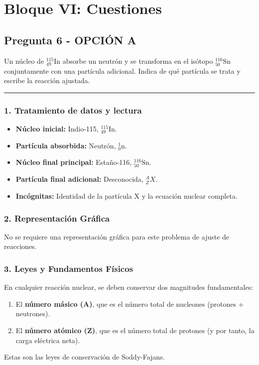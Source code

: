 \newpage

\section{Bloque VI: Cuestiones}
\label{sec:nuclear_2006_sep}

\subsection{Pregunta 6 - OPCIÓN A}
\label{subsec:6A_2006_sep}

\begin{cajaenunciado}
Un núcleo de ${}_{49}^{115}\text{In}$ absorbe un neutrón y se transforma en el isótopo ${}_{50}^{116}\text{Sn}$ conjuntamente con una partícula adicional. Indica de qué partícula se trata y escribe la reacción ajustada. 
\end{cajaenunciado}
\hrule

\subsubsection*{1. Tratamiento de datos y lectura}
\begin{itemize}
    \item \textbf{Núcleo inicial:} Indio-115, ${}_{49}^{115}\text{In}$.
    \item \textbf{Partícula absorbida:} Neutrón, ${}_{0}^{1}\text{n}$.
    \item \textbf{Núcleo final principal:} Estaño-116, ${}_{50}^{116}\text{Sn}$.
    \item \textbf{Partícula final adicional:} Desconocida, ${}_{Z}^{A}X$.
    \item \textbf{Incógnitas:} Identidad de la partícula X y la ecuación nuclear completa.
\end{itemize}

\subsubsection*{2. Representación Gráfica}
No se requiere una representación gráfica para este problema de ajuste de reacciones.

\subsubsection*{3. Leyes y Fundamentos Físicos}
En cualquier reacción nuclear, se deben conservar dos magnitudes fundamentales:
\begin{enumerate}
    \item El \textbf{número másico (A)}, que es el número total de nucleones (protones + neutrones).
    \item El \textbf{número atómico (Z)}, que es el número total de protones (y por tanto, la carga eléctrica neta).
\end{enumerate}
Estas son las leyes de conservación de Soddy-Fajans.

